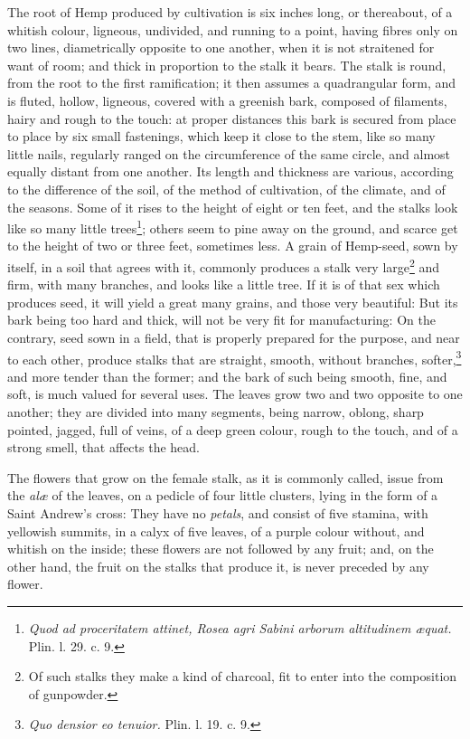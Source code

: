 \documentclass[a4paper, 11pt, oneside, polutonikogreek, english]{article}
\begin{document}
The root of Hemp produced by cultivation is six inches long, or thereabout, of a whitish colour, ligneous, undivided, and running to a point, having fibres only on two lines, diametrically opposite to one another, when it is not straitened for want of room; and thick in proportion to the stalk it bears. The stalk is round, from the root to the first ramification; it then assumes a quadrangular form, and is fluted, hollow, ligneous, covered with a greenish bark, composed of filaments, hairy and rough to the touch: at proper distances this bark is secured from place to place by six small fastenings, which keep it close to the stem, like so many little nails, regularly ranged on the circumference of the same circle, and almost equally distant from one another. Its length and thickness are various, according to the difference of the soil, of the method of cultivation, of the climate, and of the seasons. Some of it rises to the height of eight or ten feet, and the stalks look like so many little trees\footnote{\emph{Quod ad proceritatem attinet, Rosea agri Sabini arborum altitudinem æquat.} Plin. l. 29. c. 9.}; others seem to pine away on the ground, and scarce get to the height of two or three feet, sometimes less. A grain of Hemp-seed, sown by itself, in a soil that agrees with it, commonly produces a stalk very large\footnote{Of such stalks they make a kind of charcoal, fit to enter into the composition of gunpowder.} and firm, with many branches, and looks like a little tree. If it is of that sex which produces seed, it will yield a great many grains, and those very beautiful: But its bark being too hard and thick, will not be very fit for manufacturing: On the contrary, seed sown in a field, that is properly prepared for the purpose, and near to each other, produce stalks that are straight, smooth, without branches, softer,\footnote{\emph{Quo densior eo tenuior.} Plin. l. 19. c. 9.} and more tender than the former; and the bark of such being smooth, fine, and soft, is much valued for several uses. The leaves grow two and two opposite to one another; they are divided into many segments, being narrow, oblong, sharp pointed, jagged, full of veins, of a deep green colour, rough to the touch, and of a strong smell, that affects the head.

The flowers that grow on the female stalk, as it is commonly called, issue from the \emph{alæ} of the leaves, on a pedicle of four little clusters, lying in the form of a Saint Andrew's cross: They have no \emph{petals}, and consist of five stamina, with yellowish summits, in a calyx of five leaves, of a purple colour without, and whitish on the inside; these flowers are not followed by any fruit; and, on the other hand, the fruit on the stalks that produce it, is never preceded by any flower.
\end{document}
